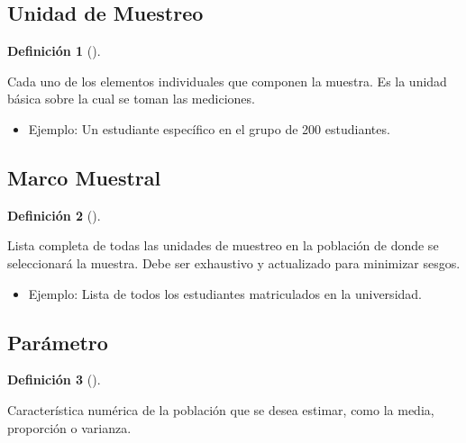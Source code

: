 \documentclass[
  us-letterpaper,
]{scrreprt}
\providecommand{\tightlist}{%
  \setlength{\itemsep}{0pt}\setlength{\parskip}{0pt}}\usepackage{longtable,booktabs,array}
\theoremstyle{plain}
\theoremstyle{plain}
\theoremstyle{definition}
\newtheorem{definition}{Definición}[chapter]
\theoremstyle{remark}
\begin{document}
\subsection{Unidad de Muestreo}\label{unidad-de-muestreo}

\begin{definition}[]\protect\hypertarget{def-unidad_muestreo}{}\label{def-unidad_muestreo}

Cada uno de los elementos individuales que componen la muestra. Es la
unidad básica sobre la cual se toman las mediciones.

\end{definition}

\begin{itemize}
\tightlist
\item
  Ejemplo: Un estudiante específico en el grupo de 200 estudiantes.
\end{itemize}

\subsection{Marco Muestral}\label{marco-muestral}

\begin{definition}[]\protect\hypertarget{def-muestral}{}\label{def-muestral}

Lista completa de todas las unidades de muestreo en la población de
donde se seleccionará la muestra. Debe ser exhaustivo y actualizado para
minimizar sesgos.

\end{definition}

\begin{itemize}
\tightlist
\item
  Ejemplo: Lista de todos los estudiantes matriculados en la
  universidad.
\end{itemize}

\subsection{Parámetro}\label{paruxe1metro}

\begin{definition}[]\protect\hypertarget{def-parámetro}{}\label{def-parámetro}

Característica numérica de la población que se desea estimar, como la
media, proporción o varianza.

\end{definition}
\end{document}
